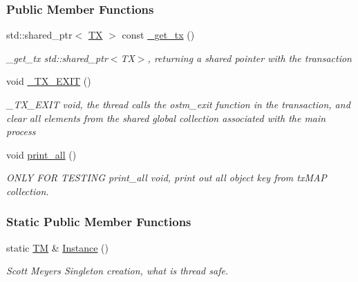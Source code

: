 \subsubsection*{Public Member Functions}
\begin{DoxyCompactItemize}
\item 
std\+::shared\+\_\+ptr$<$ \hyperlink{class_t_x}{TX} $>$ const \hyperlink{class_t_m_a41cb0226cc4080c931651b13f74a0075_a41cb0226cc4080c931651b13f74a0075}{\+\_\+get\+\_\+tx} ()
\begin{DoxyCompactList}\small\item\em \+\_\+get\+\_\+tx std\+::shared\+\_\+ptr$<$\+T\+X$>$, returning a shared pointer with the transaction \end{DoxyCompactList}\item 
void \hyperlink{class_t_m_a5e2d1127f2429f2f524d25f430eade06_a5e2d1127f2429f2f524d25f430eade06}{\+\_\+\+T\+X\+\_\+\+E\+X\+IT} ()
\begin{DoxyCompactList}\small\item\em \+\_\+\+T\+X\+\_\+\+E\+X\+IT void, the thread calls the ostm\+\_\+exit function in the transaction, and clear all elements from the shared global collection associated with the main process \end{DoxyCompactList}\item 
void \hyperlink{class_t_m_a1d6891b1d3e71cc0acef54e7afe71c09_a1d6891b1d3e71cc0acef54e7afe71c09}{print\+\_\+all} ()
\begin{DoxyCompactList}\small\item\em O\+N\+LY F\+OR T\+E\+S\+T\+I\+NG print\+\_\+all void, print out all object key from tx\+M\+AP collection. \end{DoxyCompactList}\end{DoxyCompactItemize}
\subsubsection*{Static Public Member Functions}
\begin{DoxyCompactItemize}
\item 
static \hyperlink{class_t_m}{TM} \& \hyperlink{class_t_m_a7ce5f35e0dae76df4fe116cf905bbe60_a7ce5f35e0dae76df4fe116cf905bbe60}{Instance} ()
\begin{DoxyCompactList}\small\item\em Scott Meyer\textquotesingle{}s Singleton creation, what is thread safe. \end{DoxyCompactList}\end{DoxyCompactItemize}
